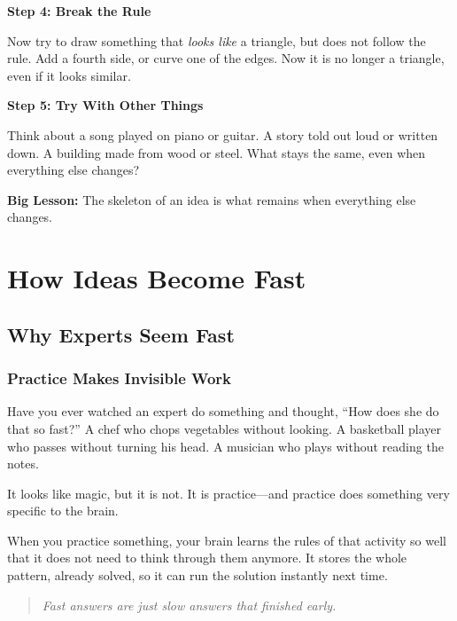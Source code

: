 \documentclass[12pt]{book}
\begin{document}
\textbf{Step 4: Break the Rule}

Now try to draw something that \emph{looks like} a triangle, but does not
follow the rule. Add a fourth side, or curve one of the edges. Now it is
no longer a triangle, even if it looks similar.

\textbf{Step 5: Try With Other Things}

Think about a song played on piano or guitar. A story told out loud or
written down. A building made from wood or steel. What stays the same,
even when everything else changes?

\textbf{Big Lesson:} The skeleton of an idea is what remains when
everything else changes.

\part{How Ideas Become Fast}

\chapter{Why Experts Seem Fast}

\section{Practice Makes Invisible Work}

Have you ever watched an expert do something and thought, ``How does she
do that so fast?'' A chef who chops vegetables without looking. A basketball
player who passes without turning his head. A musician who plays without
reading the notes.

It looks like magic, but it is not. It is practice---and practice does
something very specific to the brain.

When you practice something, your brain learns the rules of that activity
so well that it does not need to think through them anymore. It stores the
whole pattern, already solved, so it can run the solution instantly next
time.

\begin{quote}\itshape
Fast answers are just slow answers that finished early.
\end{quote}
\end{document}
